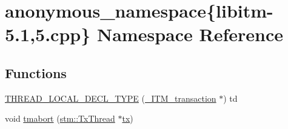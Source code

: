 \hypertarget{namespaceanonymous__namespace_02libitm-5_81_005_8cpp_03}{\section{anonymous\-\_\-namespace\{libitm-\/5.1,5.cpp\} Namespace Reference}
\label{namespaceanonymous__namespace_02libitm-5_81_005_8cpp_03}
}
\subsection*{Functions}
\begin{DoxyCompactItemize}
\item 
\hyperlink{namespaceanonymous__namespace_02libitm-5_81_005_8cpp_03_ace8c647e409f1fb27af6e0a3df63100c}{T\-H\-R\-E\-A\-D\-\_\-\-L\-O\-C\-A\-L\-\_\-\-D\-E\-C\-L\-\_\-\-T\-Y\-P\-E} (\hyperlink{libitm_8h_a65d3a93d285fdbde408558d6b431abc8}{\-\_\-\-I\-T\-M\-\_\-transaction} $\ast$) td
\item 
void \hyperlink{namespaceanonymous__namespace_02libitm-5_81_005_8cpp_03_a4c66a5e4427961d821f3a610417cbf56}{tmabort} (\hyperlink{structstm_1_1TxThread}{stm\-::\-Tx\-Thread} $\ast$\hyperlink{stmskip_8cc_a0f1c58699b83ce5a08bd9ee859250d72}{tx})
\end{DoxyCompactItemize}


